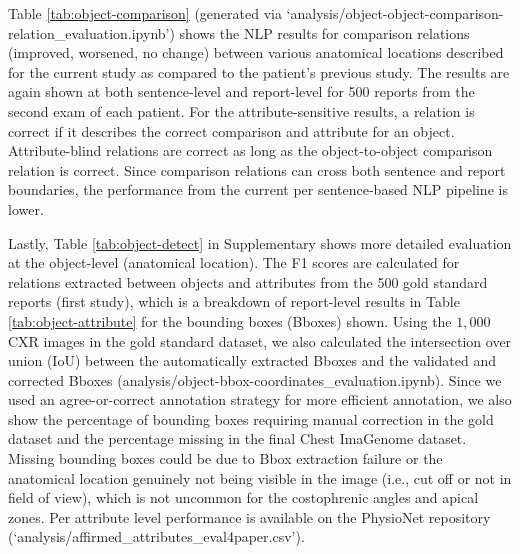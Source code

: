 Table \ref{tab:object-comparison} (generated via `analysis/object-object-comparison-relation\_evaluation.ipynb')
shows the NLP results for comparison relations (improved, worsened, no change) between various anatomical locations described for the current study as compared to the patient's previous study. The results are again shown at both sentence-level and report-level for 500 reports from the second exam of each patient. For the attribute-sensitive results, a relation is correct if it describes the correct comparison and attribute for an object. Attribute-blind relations are correct as long as the object-to-object comparison relation is correct. Since comparison relations can cross both sentence and report boundaries, the performance from the current per sentence-based NLP pipeline is lower.

Lastly, Table \ref{tab:object-detect} in Supplementary shows more detailed evaluation at the object-level (anatomical location). The F1 scores are calculated for relations extracted between objects and attributes from the 500 gold standard reports (first study), which is a breakdown of report-level results in Table \ref{tab:object-attribute} for the bounding boxes (Bboxes) shown.  Using the $1,000$ CXR images in the gold standard dataset, we also calculated the intersection over union (IoU) between the automatically extracted Bboxes and the validated and corrected Bboxes (analysis/object-bbox-coordinates\_evaluation.ipynb). Since we used an agree-or-correct annotation strategy for more efficient annotation, we also show the percentage of bounding boxes requiring manual correction in the gold dataset and the percentage missing in the final Chest ImaGenome dataset. Missing bounding boxes could be due to Bbox extraction failure or the anatomical location genuinely not being visible in the image (i.e., cut off or not in field of view), which is not uncommon for the costophrenic angles and apical zones. Per attribute level performance is available on the PhysioNet repository (`analysis/affirmed\_attributes\_eval4paper.csv').



